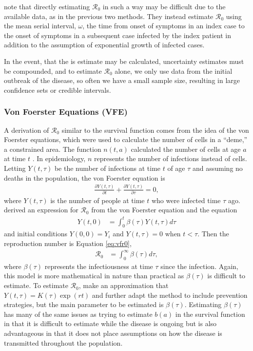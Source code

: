 \documentclass[12pt]{article}
\newcommand{\rr}{\ensuremath{\mathcal{R}_0}}
\begin{document}
\cite{lipsitch2003} note that directly estimating $\rr$ in such a way may be difficult due to the available data, as in the previous two methods.  They instead estimate $\rr$ using the mean serial interval, $\omega$, the time from onset of symptoms in an index case to the onset of symptoms in a subsequent case infected by the index patient in addition to the assumption of exponential growth of infected cases.

In the event, that the is estimate may be calculated, uncertainty estimates must be compounded, and to estimate $\rr$ alone, we only use data from the initial outbreak of the disease, so often we have a small sample size, resulting in large confidence sets or credible intervals.



\subsubsection{Von Foerster Equations (VFE)}
\label{sec:direct-estim-surv}

A derivation of $\rr$ similar to the survival function comes from the idea of the von Foerster equations, which were used to calculate the number of cells in a ``deme,'' a constrained area.  The function $n(t, a)$ calculated the number of cells at age $a$ at time $t$ \citep{trucco1965}.  In epidemiology, $n$ represents the number of infections instead of cells. Letting $Y(t, \tau)$ be the number of infections at time $t$ of age $\tau$ and assuming no deaths in the population, the von Foerster equation is
\begin{align*}
  \frac{\partial Y(t, \tau)}{\partial t} +   \frac{\partial Y(t, \tau)}{\partial \tau} = 0,
\end{align*}
where $Y(t,\tau)$ is the number of people at time $t$ who were infected time $\tau$ ago.    \cite{fraser2004factors} derived an expression for $\rr$ from the von Foerster equation and the equation
\begin{align*}
  Y(t,0) &= \int_0^t \beta( \tau) Y(t, \tau) d \tau
\end{align*}
and initial conditions $Y(0,0) = Y_i$ and $Y(t, \tau) = 0$ when $t < \tau$.  Then the reproduction number is Equation \ref{eq:vfr0},
\begin{align}\label{eq:vfr0}
\rr &= \int_0^\infty \beta(\tau) d\tau,
\end{align}
 where $\beta (\tau)$ represents the infectiousness at time $\tau$ since the infection.    Again, this model is more mathematical in nature than practical as $\beta (\tau)$ is difficult to estimate.  To estimate $\rr$, \cite{fraser2004factors} make an approximation that $Y(t, \tau) = K(\tau) \exp (rt)$ and further adapt the method to include prevention strategies, but the main parameter to be estimated is $\beta (\tau)$.  Estimating $\beta (\tau)$ has many of the same issues as trying to estimate $b(a)$ in the survival function in that it is difficult to estimate while the disease is ongoing but is also advantageous in that it does not place assumptions on how the disease is transmitted throughout the population.
\end{document}
